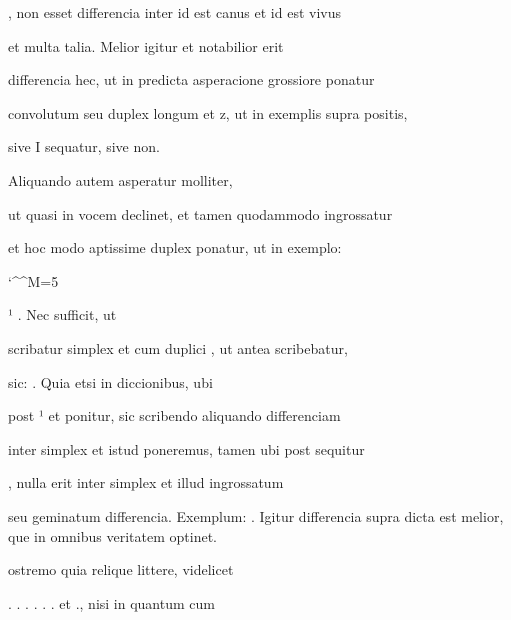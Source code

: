 , non esset differencia inter  id est canus et  id est vivus

et multa talia. Melior igitur et notabilior erit

differencia hec, ut in predicta asperacione grossiore ponatur

 convolutum seu duplex longum et z, ut in exemplis supra positis,

\splitlines

sive I sequatur, sive non.

\indentK Aliquando autem asperatur molliter,

\fulllines

ut quasi in vocem  declinet, et tamen quodammodo  ingrossatur

et hoc modo aptissime duplex  ponatur, ut in exemplo:

\catcode `\^^M=5
\obeylines

¹    . Nec sufficit, ut


scribatur simplex  et  cum duplici , ut antea scribebatur,

sic:  . Quia etsi in diccionibus, ubi

post     ¹ et  ponitur, sic scribendo aliquando differenciam

inter simplex  et istud poneremus, tamen ubi post  sequitur

, nulla erit inter simplex  et illud ingrossatum

seu geminatum differencia. Exemplum:   . Igitur differencia
supra dicta est melior, que in omnibus veritatem optinet.

\indentP {}ostremo quia relique littere, videlicet

 . . . . .  .  et ., nisi in quantum cum


